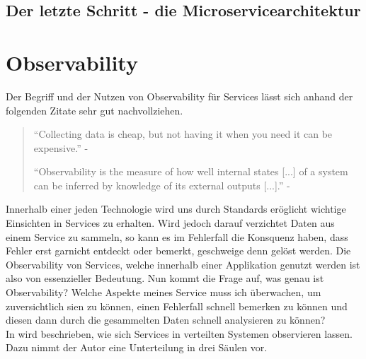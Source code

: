 \subsection{Der letzte Schritt - die Microservicearchitektur}

\section{Observability}

Der Begriff und der Nutzen von Observability für Services lässt sich anhand der folgenden Zitate sehr gut nachvollziehen.

\begin{quote}
	\enquote{Collecting data is cheap, but not having it when you need it can be expensive.}\autocite[S. 373]{microservice_enterprise} - \textit{\citeauthor{microservice_enterprise}}

	\enquote{Observability is the measure of how well internal states [...] of a system can be inferred by knowledge of its external outputs [...].}\autocite[S. 35]{Yordanova2016} - \textit{\citeauthor{Yordanova2016}}
\end{quote}

Innerhalb einer jeden Technologie wird uns durch Standards  eröglicht wichtige Einsichten in Services zu erhalten. Wird jedoch darauf verzichtet Daten aus einem Service zu sammeln, so kann es im Fehlerfall die Konsquenz haben, dass Fehler erst garnicht entdeckt oder bemerkt, geschweige denn gelöst werden. Die Observability von Services, welche innerhalb einer Applikation genutzt werden ist also von essenzieller Bedeutung. Nun kommt die Frage auf, was genau ist Observability? Welche Aspekte meines Service muss ich überwachen, um zuversichtlich sien zu können, einen Fehlerfall schnell bemerken zu können und diesen dann durch die gesammelten Daten schnell analysieren zu können?\\
In  wird beschrieben, wie sich Services in verteilten Systemen observieren lassen. Dazu nimmt der Autor eine Unterteilung in drei Säulen vor.

